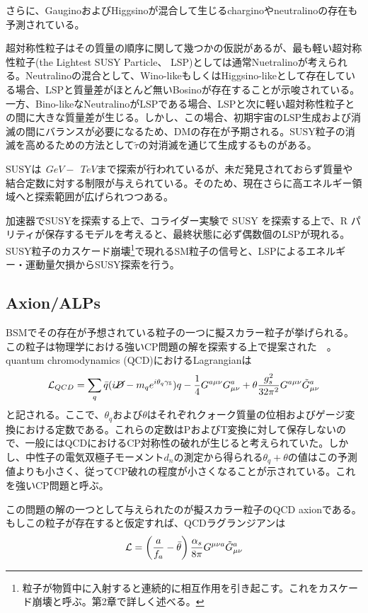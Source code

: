 さらに、GauginoおよびHiggsinoが混合して生じるcharginoやneutralinoの存在も予測されている。

超対称性粒子はその質量の順序に関して幾つかの仮説があるが、最も軽い超対称性粒子(the Lightest SUSY Particle、 LSP)としては通常Nuetralinoが考えられる。Neutralinoの混合として、Wino-likeもしくはHiggsino-likeとして存在している場合、LSPと質量差がほとんど無いBosinoが存在することが示唆されている。一方、Bino-likeなNeutralinoがLSPである場合、LSPと次に軽い超対称性粒子との間に大きな質量差が生じる。しかし、この場合、初期宇宙のLSP生成および消滅の間にバランスが必要になるため、DMの存在が予期される。SUSY粒子の消滅を高めるための方法として$\tilde{\tau}$の対消滅を通じて生成するものがある。

SUSYは$\ \SI{}{GeV} - \ \SI{}{TeV}$まで探索が行われているが、未だ発見されておらず質量や結合定数に対する制限が与えられている。そのため、現在さらに高エネルギー領域へと探索範囲が広げられつつある。

加速器でSUSYを探索する上で、コライダー実験で SUSY を探索する上で、R パリティが保存するモデルを考えると、最終状態に必ず偶数個のLSPが現れる。
SUSY粒子のカスケード崩壊\footnote{粒子が物質中に入射すると連続的に相互作用を引き起こす。これをカスケード崩壊と呼ぶ。第2章で詳しく述べる。}で現れるSM粒子の信号と、LSPによるエネルギー・運動量欠損からSUSY探索を行う。

\subsection{Axion/ALPs}
BSMでその存在が予想されている粒子の一つに擬スカラー粒子が挙げられる。この粒子は物理学における強いCP問題の解を探索する上で提案された~\cite{Axion}~\cite{Axion1}。  quantum chromodynamics (QCD)におけるLagrangianは
\[
{\cal L}_{QCD} = \sum_{q} \bar{q}(i \cancel D - m_q e^{i\theta_q \gamma_5})q -\frac{1}{4} G^{a \mu\nu}G^a_{\mu\nu} + \theta \frac{g_s^2}{32\pi^2}G^{a\mu\nu}\tilde{G}^a_{\mu\nu}
\]
と記される。ここで、$\theta_q$および$\theta$はそれぞれクォーク質量の位相およびゲージ変換における定数である。これらの定数はPおよびT変換に対して保存しないので、一般にはQCDにおけるCP対称性の破れが生じると考えられていた。しかし、中性子の電気双極子モーメント$d_n$の測定から得られる$\theta_q + \theta$の値はこの予測値よりも小さく、従ってCP破れの程度が小さくなることが示されている。これを強いCP問題と呼ぶ。

この問題の解の一つとして与えられたのが擬スカラー粒子のQCD axionである。もしこの粒子が存在すると仮定すれば、QCDラグランジアンは
\begin{equation}
{\cal L} = \left(\frac{a}{f_a} - \bar{\theta}\right) \frac{\alpha_s}{8\pi }G^{\mu\nu a}\tilde{G}^a_{\mu\nu} 
\end{equation}

